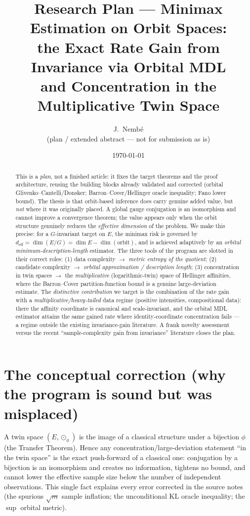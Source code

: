 \documentclass[11pt]{article}
\title{\textbf{Research Plan --- Minimax Estimation on Orbit Spaces:\\
the Exact Rate Gain from Invariance via Orbital MDL\\
and Concentration in the Multiplicative Twin Space}}
\author{J.~Nemb\'e \\ \small (plan / extended abstract --- not for submission as is)}
\date{\today}
\theoremstyle{plain}
\theoremstyle{definition}
\theoremstyle{remark}
\DeclareMathOperator{\dimm}{dim}
\begin{document}
\maketitle

\begin{abstract}
This is a \emph{plan}, not a finished article: it fixes the target theorems and
the proof architecture, reusing the building blocks already validated and
corrected (orbital Glivenko--Cantelli/Donsker; Barron--Cover/Hellinger oracle
inequality; Fano lower bound). The thesis is that orbit-based inference does
carry genuine added value, but \emph{not} where it was originally placed. A
global gauge conjugation is an isomorphism and cannot improve a convergence
theorem; the value appears only when the orbit structure genuinely reduces the
\emph{effective dimension} of the problem. We make this precise: for a
$G$-invariant target on $E$, the minimax risk is governed by
$d_{\mathrm{eff}}=\dimm(E/G)=\dimm E-\dimm(\text{orbit})$, and is achieved
adaptively by an \emph{orbital minimum-description-length} estimator. The three
tools of the program are slotted in their correct roles: (1) data complexity
$\to$ \emph{metric entropy of the quotient}; (2) candidate complexity $\to$
\emph{orbital approximation / description length}; (3) concentration in twin
spaces $\to$ the \emph{multiplicative} (logarithmic-twin) space of Hellinger
affinities, where the Barron--Cover partition-function bound is a genuine
large-deviation estimate. The \emph{distinctive contribution} we target is the
combination of the rate gain with a \emph{multiplicative/heavy-tailed} data
regime (positive intensities, compositional data): there the affinity coordinate
is canonical and scale-invariant, and the orbital MDL estimator attains the same
gained rate where identity-coordinate concentration fails --- a regime outside
the existing invariance-gain literature. A frank novelty assessment versus the
recent ``sample-complexity gain from invariance'' literature closes the plan.
\end{abstract}

\tableofcontents

\section{The conceptual correction (why the program is sound but was misplaced)}

A twin space $(E,\odot_\phi)$ is the image of a classical structure under a
bijection $\phi$ (the Transfer Theorem). Hence any concentration/large-deviation
statement ``in the twin space'' is the exact push-forward of a classical one:
conjugation by a bijection is an isomorphism and creates no information, tightens
no bound, and cannot lower the effective sample size below the number of
independent observations. This single fact explains every error corrected in the
source notes (the spurious $\sqrt{m}$ sample inflation; the unconditional KL
oracle inequality; the $\sup$ orbital metric).
\end{document}
